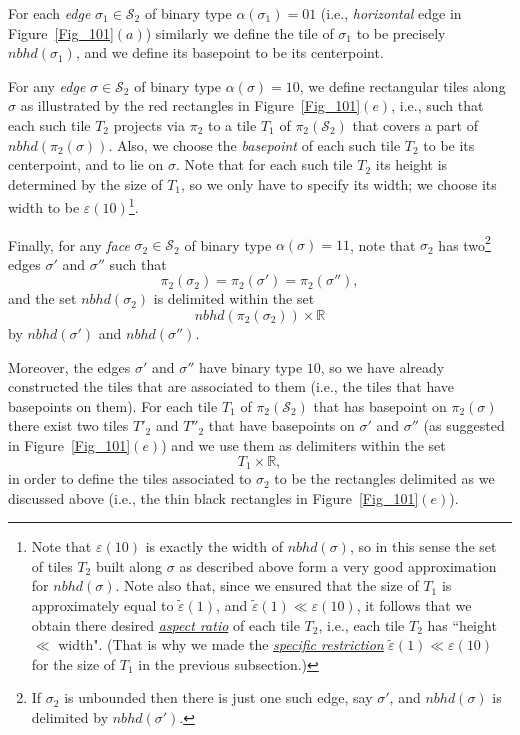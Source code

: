 \documentclass[12pt,letterpaper]{article}
\renewcommand{\S}{\mathcal{S}}
\newcommand{\RR}{\mathbb{R}}
\newcommand{\eps}{\varepsilon}
\newcommand{\et}{\tilde\eps}
\newcommand{\nbhd}{\mathit{nbhd}}
\renewcommand{\a}{\alpha}
\begin{document}
\smallskip

For each {\em edge} $\sigma_1 \in \S_2$ of binary type  $\a(\sigma_1) = 01$ (i.e., {\em horizontal} edge in Figure~\ref{Fig_101}$(a)$) similarly we define the tile of $\sigma_1$ to be  precisely $\nbhd(\sigma_1)$, and we define its basepoint to be its centerpoint.

\smallskip

For any {\em edge} $\sigma \in \S_2$ of binary type  $\a(\sigma) = 10$, we define rectangular tiles along $\sigma$ as illustrated by the red rectangles in Figure~\ref{Fig_101}$(e)$, i.e., such that each such tile $T_2$ projects via $\pi_2$ to a tile $T_1$ of $\pi_2(\S_2)$ that covers a part of $\nbhd(\pi_2(\sigma))$. 
Also, we choose the {\em basepoint} of each such tile $T_2$ to be its centerpoint, and to lie on $\sigma$. 
Note that for each such tile $T_2$ its height is determined by the size of $T_1$, so we only have to specify its width; we choose its width to be $\eps(10)$\footnote{Note that $\eps(10)$ is exactly the width of $\nbhd(\sigma)$, so in this sense the set of tiles $T_2$ built along $\sigma$ as described above form a very good approximation for $\nbhd(\sigma)$. Note also that, since we ensured that the size of $T_1$ is approximately equal to $\et(1)$, and  $\et(1) \ll \eps(10)$, it follows that we obtain there desired  \ul{\em aspect ratio} of each tile $T_2$, i.e., each tile $T_2$ has ``height $\ll$ width". (That is why we made the \ul{\em specific restriction}  $\et(1) \ll \eps(10)$ for the size of $T_1$ in the previous subsection.)}. 


\smallskip

Finally, for any {\em face} $\sigma_2 \in \S_2$ of binary type  $\a(\sigma) = 11$, note that $\sigma_2$ has two\footnote{If $\sigma_2$ is unbounded then there is just one such edge, say $\sigma'$, and $\nbhd(\sigma)$ is delimited by $\nbhd(\sigma')$.} edges $\sigma'$ and $\sigma''$ such that
$$
\pi_2(\sigma_2) = \pi_2(\sigma') = \pi_2(\sigma''),
$$
and the set $\nbhd(\sigma_2)$ is delimited within the set 
$$
\nbhd(\pi_2(\sigma_2)) \times \RR
$$ 
by $\nbhd(\sigma')$ and $\nbhd(\sigma'')$. 

Moreover, the edges $\sigma'$ and $\sigma''$ have binary type $10$,  so we have already constructed the tiles that are associated to them (i.e., the tiles that have basepoints on them). For each tile $T_1$ of $\pi_2(\S_2)$ that has basepoint on $\pi_2(\sigma)$ there exist two tiles $T'_2$ and $T''_2$ that have basepoints on  $\sigma'$ and $\sigma''$ (as suggested in Figure~\ref{Fig_101}$(e)$) and we use them as delimiters within the set 
$$
T_1  \times \RR,
$$ 
in order to  define the tiles associated to $\sigma_2$ to be the rectangles delimited as we discussed above (i.e.,  the thin black rectangles in Figure~\ref{Fig_101}$(e)$). 
\end{document}
